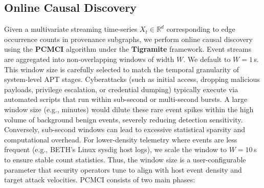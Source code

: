 \subsection{Online Causal Discovery}
Given a multivariate streaming time-series $X_t \in \mathbb{R}^d$ corresponding to edge occurrence counts in provenance subgraphs, we perform online causal discovery using the \textbf{PCMCI} algorithm \cite{pcmci2019} under the \textbf{Tigramite} framework. Event streams are aggregated into non-overlapping windows of width $W$. We default to $W = 1$\,s. This window size is carefully selected to match the temporal granularity of system-level APT stages. Cyberattacks (such as initial access, dropping malicious payloads, privilege escalation, or credential dumping) typically execute via automated scripts that run within sub-second or multi-second bursts. A large window size (e.g., minutes) would dilute these rare event spikes within the high volume of background benign events, severely reducing detection sensitivity. Conversely, sub-second windows can lead to excessive statistical sparsity and computational overhead. For lower-density telemetry where events are less frequent (e.g., BETH's Linux sysdig host logs), we scale the window to $W = 10$\,s to ensure stable count statistics. Thus, the window size is a user-configurable parameter that security operators tune to align with host event density and target attack velocities. PCMCI consists of two main phases:
